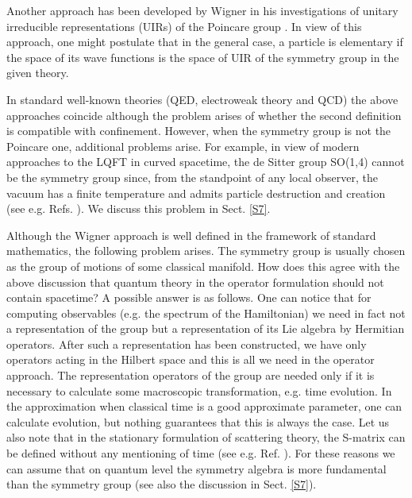 \documentclass[a4paper,12pt]{article}%
\begin{document}
Another approach has been developed by Wigner in his 
investigations of unitary irreducible representations 
(UIRs) of the Poincare group \cite{Wigner}. In view 
of this approach, one might postulate that in the 
general case, a particle is elementary if the space 
of its wave functions is the space of UIR of the 
symmetry group in the given theory.

In standard well-known theories (QED, electroweak 
theory and QCD) the above approaches coincide 
although the problem arises of whether the second 
definition is compatible with confinement. However, 
when the symmetry group is not the Poincare one, 
additional problems arise. For example, in view of 
modern approaches to the LQFT in curved spacetime, 
the de Sitter group SO(1,4) cannot be the symmetry 
group since, from the standpoint of any local 
observer, the vacuum has a finite temperature and 
admits particle destruction and creation (see e.g. 
Refs. \cite{Narlikar,Susskind}). We discuss this problem 
in Sect. \ref{S7}.   

Although the Wigner approach is well defined in the 
framework of standard mathematics,
the following problem arises. The symmetry group is 
usually chosen as the group of motions of some classical 
manifold. How does this agree with the above discussion 
that quantum theory in the operator formulation should 
not contain spacetime? A possible answer is as follows. 
One can notice that for computing observables (e.g. the
spectrum of the Hamiltonian) we need in fact not a 
representation of the group but a representation of its 
Lie algebra by Hermitian operators. After such a 
representation has been constructed, we have only 
operators acting in the Hilbert space and this is all 
we need in the operator approach. The representation 
operators of the group are needed only if it is 
necessary to calculate some macroscopic 
transformation, e.g. time evolution. In the approximation 
when classical time is a good approximate parameter, 
one can calculate evolution, but nothing guarantees 
that this is always the case. Let us also note that in
the stationary formulation of scattering theory, the
S-matrix can be defined without any mentioning of
time (see e.g. Ref. \cite{Kato}). For these reasons 
we can assume that on quantum level the symmetry 
algebra is more fundamental than the symmetry group
(see also the discussion in Sect. \ref{S7}). 
\end{document}
